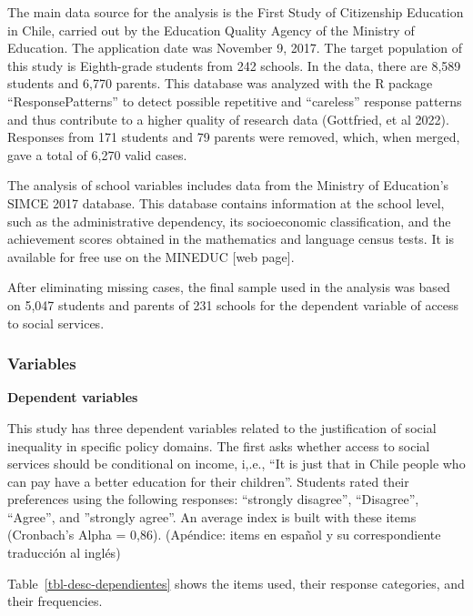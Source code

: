 \documentclass[
  letterpaper,
  DIV=11,
  numbers=noendperiod]{scrartcl}
\begin{document}
The main data source for the analysis is the First Study of Citizenship
Education in Chile, carried out by the Education Quality Agency of the
Ministry of Education. The application date was November 9, 2017. The
target population of this study is Eighth-grade students from 242
schools. In the data, there are 8,589 students and 6,770 parents. This
database was analyzed with the R package ``ResponsePatterns'' to detect
possible repetitive and ``careless'' response patterns and thus
contribute to a higher quality of research data (Gottfried, et al 2022).
Responses from 171 students and 79 parents were removed, which, when
merged, gave a total of 6,270 valid cases.

The analysis of school variables includes data from the Ministry of
Education's SIMCE 2017 database. This database contains information at
the school level, such as the administrative dependency, its
socioeconomic classification, and the achievement scores obtained in the
mathematics and language census tests. It is available for free use on
the MINEDUC {[}web page{]}.

After eliminating missing cases, the final sample used in the analysis
was based on 5,047 students and parents of 231 schools for the dependent
variable of access to social services.

\subsubsection{Variables}\label{variables}

\textbf{Dependent variables}

This study has three dependent variables related to the justification of
social inequality in specific policy domains. The first asks whether
access to social services should be conditional on income, i,.e., ``It
is just that in Chile people who can pay have a better education for
their children''. Students rated their preferences using the following
responses: ``strongly disagree'', ``Disagree'', ``Agree'', and
''strongly agree''. An average index is built with these items
(Cronbach's Alpha = 0,86). (Apéndice: items en español y su
correspondiente traducción al inglés)

Table~\ref{tbl-desc-dependientes} shows the items used, their response
categories, and their frequencies.
\end{document}
